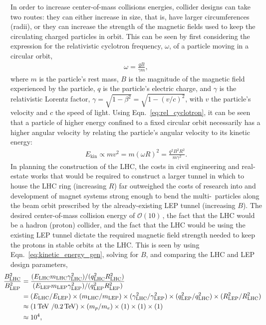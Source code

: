 In order to increase center-of-mass collisions energies, collider designs can take two routes: they can
either increase in size, that is, have larger circumferences (radii), or they can increase the strength of the magnetic
fields used to keep the circulating charged particles in orbit. This can be seen by first considering the expression
for the relativistic cyclotron frequency, $\omega$, of a particle moving in a circular orbit,
\begin{align}
    \omega = \frac{qB}{\gamma m},
    \label{eq:rel_cyclotron}
\end{align}
where $m$ is the particle's rest mass, $B$ is the magnitude of the magnetic field experienced by the
particle, $q$ is the particle's electric charge, and $\gamma$ is the relativistic Lorentz factor, $\gamma = \sqrt{1 - \beta^2} = \sqrt{1 - (v/c)^2}$,
with $v$ the particle's velocity and $c$ the speed of light.
Using Eqn.~\ref{eq:rel_cyclotron}, it can be seen that a particle of higher energy confined to a fixed
circular orbit necessarily has a higher angular velocity by relating the particle's angular
velocity to its kinetic energy:
\begin{align}
    E_{\text{kin}} \propto m v^2 = m(\omega R)^2 = \frac{q^2 B^2 R^2}{m \gamma^2}.
    \label{eq:kinetic_energy_gen}
\end{align}
In planning the construction of the LHC, the costs in civil engineering and real-estate works that would
be required to construct a larger tunnel in which to house the LHC ring (increasing $R$) far outweighed
the costs of research into and development of magnet systems strong enough to bend the
multi-\TeV~particles along the beam orbit prescribed by the already-existing LEP tunnel (increasing $B$).
The desired center-of-mass collision energy of $\mathcal{O}(10)$\,\TeV, the fact that the LHC would be a hadron (proton)
collider, and the fact that the LHC would be using the existing LEP tunnel dictate the required magnetic
field strength needed to keep the protons in stable orbits at the LHC. This
is seen by using Eqn.~\ref{eq:kinetic_energy_gen}, solving for $B$, and comparing the LHC and LEP
design parameters,
\begin{align}
    \hspace{-0.4cm}
    \frac{B^2_{\text{LHC}}}{B^2_\text{LEP}} &= \frac{ (E_{\text{LHC}} m_{\text{LHC}} \gamma_{\text{LHC}}^2) / (q_{\text{LHC}}^2 R_{\text{LHC}}^2)  } { (E_{\text{LEP}} m_{\text{LEP}} \gamma_{\text{LEP}}^2) / (q_{\text{LEP}}^2 R_{\text{LEP}}^2) } \label{eq:lhc_mag_field} \\
        &= (E_{\text{LHC}} / E_{\text{LEP}}) \times (m_{\text{LHC}} / m_{\text{LEP}}) \times (\gamma_{\text{LHC}}^2 / \gamma_{\text{LEP}}^2) \times (q_{\text{LEP}}^2 / q_{\text{LHC}}^2) \times (R_{\text{LEP}}^2 / R_{\text{LHC}}^2) \notag \\
        &\approx ( 1\,\TeV~/0.2\,\TeV) \times (m_p/ m_e) \times (1) \times (1) \times (1) \notag \\
        &\approx 10^4 \notag,
\end{align}
